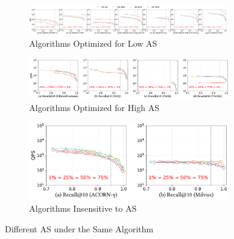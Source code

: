 \documentclass[sigconf, nonacm]{acmart}
\begin{document}
	\begin{figure}
	\centering
	
	\begin{subfigure}{\textwidth}
		\centering
		
		\includegraphics[width=0.95\textwidth]{fig/exp_5_2_1.pdf}
		\caption{Algorithms Optimized for Low AS}
		\label{fig:exp_5_2_1}
	\end{subfigure}
	
	\vfill %
	
	\begin{subfigure}{0.627\textwidth} %
		\centering
		
		\includegraphics[width=0.96\textwidth]{fig/exp_5_2_2.pdf}
		\caption{Algorithms Optimized for High AS}
		\label{fig:exp_5_2_2}
	\end{subfigure}
	\hspace{1mm} %
	\begin{subfigure}{0.33\textwidth} %
		\centering
		
		\includegraphics[width=0.96\textwidth]{fig/exp_5_2_3.pdf}
		\caption{Algorithms Insensitive to AS}
		\label{fig:exp_5_2_3}
	\end{subfigure}
	
	
	\caption{Different AS under the Same Algorithm}
	\label{fig:attribute_selectivity}
\end{figure}
\end{document}
